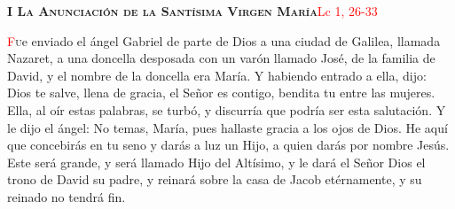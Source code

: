 \noindent\textbf{\textsc{I La Anunciación de la Santísima Virgen María}}\hfill\textcolor{red}{Lc 1, 26-33}

\vspace{0.25em}

\lettrine[lines=2]{\textcolor{red}{F}}ue enviado el ángel Gabriel de parte de Dios a una ciudad de Galilea, llamada Nazaret, 
a una doncella desposada con un varón llamado José, de la familia de David, y el nombre de la doncella era María. 
Y habiendo entrado a ella, dijo: Dios te salve, llena de gracia, el Señor es contigo, bendita tu entre las mujeres.
Ella, al oír estas palabras, se turbó, y discurría que podría ser esta salutación. Y le dijo el ángel: No temas, María, 
pues hallaste gracia a los ojos de Dios. He aquí que concebirás en tu seno y darás a luz un Hijo, a quien darás por nombre Jesús. 
Este será grande, y será llamado Hijo del Altísimo, y le dará el Señor Dios el trono de David su padre, y reinará sobre la 
casa de Jacob etérnamente, y su reinado no tendrá fin.